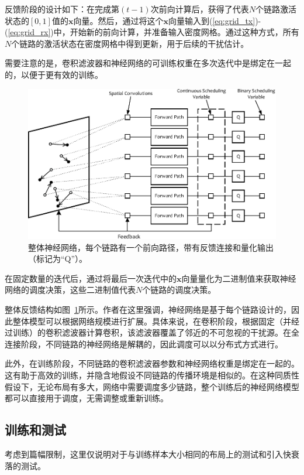 \documentclass[UTF8, 12pt]{article}
\numberwithin{figure}{section}
\begin{document}
\begin{enumerate}
反馈阶段的设计如下：在完成第$(t-1)$次前向计算后，获得了代表$N$个链路激活状态的$[0,1]$值的$\mathbf x$向量。然后，通过将这个$\mathbf x$向量输入到(\ref{eq:grid_tx})-(\ref{eq:grid_rx})中，开始新的前向计算，并准备输入密度网格。通过这种方式，所有$N$个链路的激活状态在密度网格中得到更新，用于后续的干扰估计。

需要注意的是，卷积滤波器和神经网络的可训练权重在多次迭代中是绑定在一起的，以便于更有效的训练。

\begin{figure}[htbp]
\centering
\includegraphics[width=12cm]{fig/learning_model}
\caption{整体神经网络，每个链路有一个前向路径，带有反馈连接和量化输出（标记为“Q”）。}
\label{fig:feedback}
\end{figure}

在固定数量的迭代后，通过将最后一次迭代中的$\mathbf x$向量量化为二进制值来获取神经网络的调度决策，这些二进制值代表$N$个链路的调度决策。

整体反馈结构如图~\ref{fig:feedback}所示。作者在这里强调，神经网络是基于每个链路设计的，因此整体模型可以根据网络规模进行扩展。具体来说，在卷积阶段，根据固定（并经过训练）的卷积滤波器计算卷积，该滤波器覆盖了邻近的不可忽视的干扰源。在全连接阶段，不同链路的神经网络是解耦的，因此调度可以以分布式方式进行。

此外，在训练阶段，不同链路的卷积滤波器参数和神经网络权重是绑定在一起的。这有助于高效的训练，并隐含地假设不同链路的传播环境是相似的。在这种同质性假设下，无论布局有多大，网络中需要调度多少链路，整个训练后的神经网络模型都可以直接用于调度，无需调整或重新训练。
\end{enumerate}

\subsection{训练和测试}

考虑到篇幅限制，这里仅说明对于与训练样本大小相同的布局上的测试和引入快衰落的测试。
\end{document}
